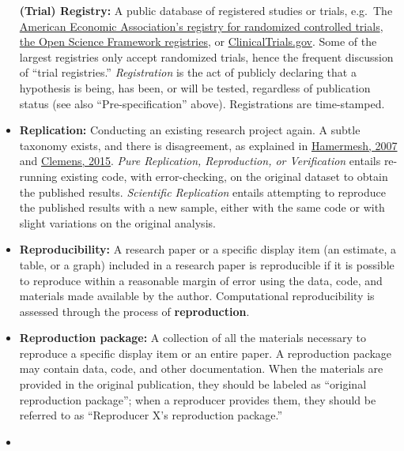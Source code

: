 \documentclass[
]{book}
\begin{document}
\begin{itemize}
  \textbf{(Trial) Registry:} A public database of registered studies or trials, e.g.~The \href{https://www.socialscienceregistry.org/}{American Economic Association's registry for randomized controlled trials}, \href{https://osf.io/prereg/}{the Open Science Framework registries}, or \href{https://www.clinicaltrials.gov/}{ClinicalTrials.gov}. Some of the largest registries only accept randomized trials, hence the frequent discussion of ``trial registries.'' \emph{Registration} is the act of publicly declaring that a hypothesis is being, has been, or will be tested, regardless of publication status (see also ``Pre-specification'' above). Registrations are time-stamped.
\item
  \textbf{Replication:} Conducting an existing research project again. A subtle taxonomy exists, and there is disagreement, as explained in \href{https://poseidon01.ssrn.com/delivery.php?ID=730022068104120012124069127117116094125005035067064043105083109027064120011088086109059117052062000025007012029080123125089014014006079063116014095000023071022077006017094093005117096083119073115079022110105075073085121117103030106102080005099007\&EXT=pdf}{Hamermesh, 2007} and \href{https://www.cgdev.org/sites/default/files/CGD-Working-Paper-399-Clemens-Meaning-Failed-Replications.pdf}{Clemens, 2015}. \emph{Pure Replication, Reproduction, or Verification} entails re-running existing code, with error-checking, on the original dataset to obtain the published results. \emph{Scientific Replication} entails attempting to reproduce the published results with a new sample, either with the same code or with slight variations on the original analysis.
\item
  \textbf{Reproducibility:} A research paper or a specific display item (an estimate, a table, or a graph) included in a research paper is reproducible if it is possible to reproduce within a reasonable margin of error using the data, code, and materials made available by the author. Computational reproducibility is assessed through the process of \textbf{reproduction}.
\item
  \textbf{Reproduction package:} A collection of all the materials necessary to reproduce a specific display item or an entire paper. A reproduction package may contain data, code, and other documentation. When the materials are provided in the original publication, they should be labeled as ``original reproduction package''; when a reproducer provides them, they should be referred to as ``Reproducer X's reproduction package.''
\item

\end{itemize}
\end{document}
